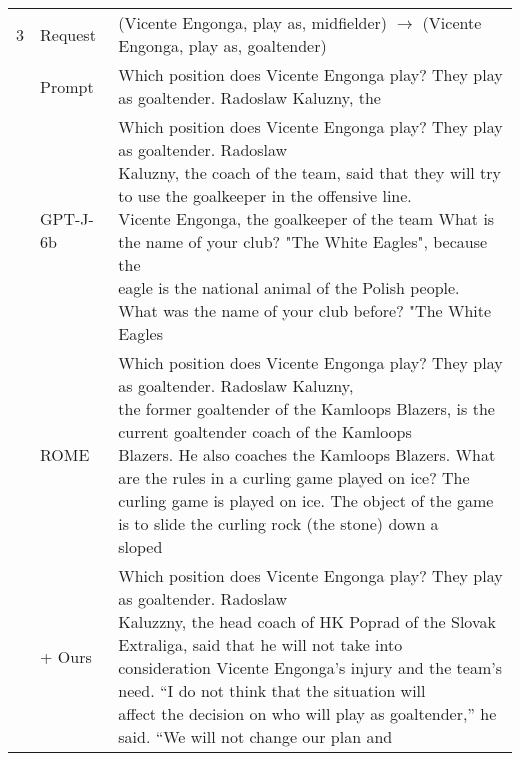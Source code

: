 \begin{table*}[t]
{\begin{tabular}{c | l | l }
\midrule
\multirow{1}{*}{3} 
    & Request & (Vicente Engonga, play as, midfielder) $\rightarrow$ (Vicente Engonga, play as, goaltender)\\
    \cmidrule{2-3}
    & Prompt & Which position does Vicente Engonga play? They play as goaltender. Radoslaw Kaluzny, the \\
    \cmidrule{2-3}
    & GPT-J-6b & \makecell[l]{Which position does Vicente Engonga play? They play as goaltender. Radoslaw \\Kaluzny, the coach of the team, said that they will try to use the goalkeeper in the offensive line. \\Vicente Engonga, the goalkeeper of the team What is the name of your club? "The White Eagles", because the\\ eagle is the national animal of the Polish people. What was the name of your club before? "The White Eagles} \\
    \cmidrule{2-3}
     & ROME & \makecell[l]{Which position does Vicente Engonga play? They play as goaltender. Radoslaw Kaluzny,\\ the former goaltender of the Kamloops Blazers, is the current goaltender coach of the Kamloops\\ Blazers. He also coaches the Kamloops Blazers. What are the rules in a curling game played on ice? The \\curling game is played on ice. The object of the game is to slide the curling rock (the stone) down a \\sloped} \\
     \cmidrule{2-3}
     & + Ours & \makecell[l]{Which position does Vicente Engonga play? They play as goaltender. Radoslaw \\Kaluzzny, the head coach of HK Poprad of the Slovak Extraliga, said that he will not take into \\consideration Vicente Engonga’s injury and the team’s need. “I do not think that the situation will \\affect the decision on who will play as goaltender,” he said. “We will not change our plan and} \\


     
\bottomrule
\end{tabular}}

\label{tab:case_relation}
\end{table*}